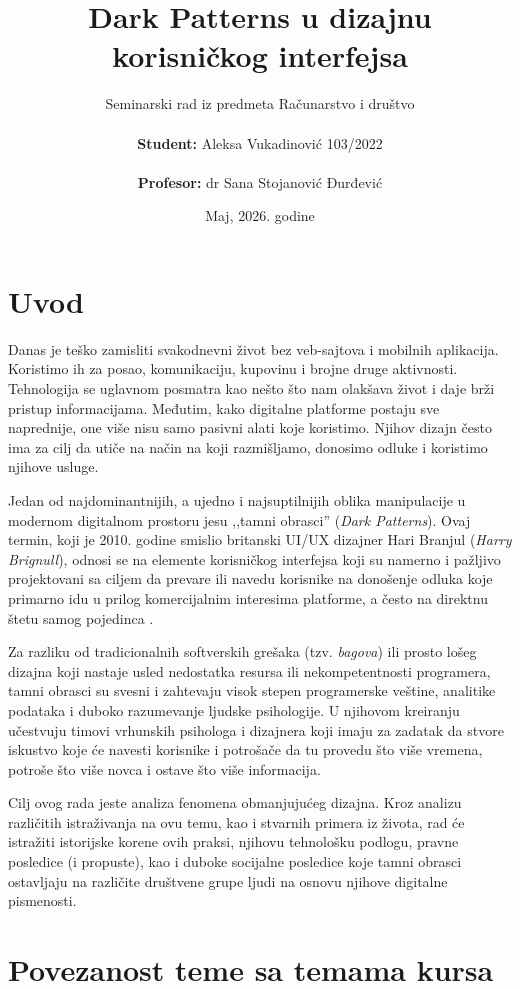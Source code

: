 \documentclass[12pt,a4paper]{article}
\title{\bf Dark Patterns u dizajnu korisničkog interfejsa}
\author{Seminarski rad iz predmeta Računarstvo i društvo \\\\ [1cm] {\bf Student:} Aleksa Vukadinović \quad {\bf Indeks:} 103/2022 \\\\ [0.3cm] {\bf Profesor:} dr Sana Stojanović Đurđević}
\date{Maj, 2026. godine}
\begin{document}
\maketitle
\newpage

\tableofcontents
\newpage

\section{Uvod}
Danas je teško zamisliti svakodnevni život bez veb-sajtova i mobilnih aplikacija. Koristimo ih za posao, komunikaciju, kupovinu i brojne druge aktivnosti. Tehnologija se uglavnom posmatra kao nešto što nam olakšava život i daje brži pristup informacijama. Međutim, kako digitalne platforme postaju sve naprednije, one više nisu samo pasivni alati koje koristimo. Njihov dizajn često ima za cilj da utiče na način na koji razmišljamo, donosimo odluke i koristimo njihove usluge.

Jedan od najdominantnijih, a ujedno i najsuptilnijih oblika manipulacije u modernom digitalnom prostoru jesu ,,tamni obrasci'' (\emph{Dark Patterns}). Ovaj termin, koji je 2010. godine smislio britanski UI/UX dizajner Hari Branjul (\emph{Harry Brignull}), odnosi se na elemente korisničkog interfejsa koji su namerno i pažljivo projektovani sa ciljem da prevare ili navedu korisnike na donošenje odluka koje primarno idu u prilog komercijalnim interesima platforme, a često na direktnu štetu samog pojedinca \cite{mathur2019dark}.

Za razliku od tradicionalnih softverskih grešaka (tzv. \emph{bagova}) ili prosto lošeg dizajna koji nastaje usled nedostatka resursa ili nekompetentnosti programera, tamni obrasci su svesni i zahtevaju visok stepen programerske veštine, analitike podataka i duboko razumevanje ljudske psihologije. U njihovom kreiranju učestvuju timovi vrhunskih psihologa i dizajnera koji imaju za zadatak da stvore iskustvo koje će navesti korisnike i potrošače da tu provedu što više vremena, potroše što više novca i ostave što više informacija.

Cilj ovog rada jeste analiza fenomena obmanjujućeg dizajna. Kroz analizu različitih istraživanja na ovu temu, kao i stvarnih primera iz života, rad će istražiti istorijske korene ovih praksi, njihovu tehnološku podlogu, pravne posledice (i propuste), kao i duboke socijalne posledice koje tamni obrasci ostavljaju na različite društvene grupe ljudi na osnovu njihove digitalne pismenosti.

\section{Povezanost teme sa temama kursa}
\end{document}
